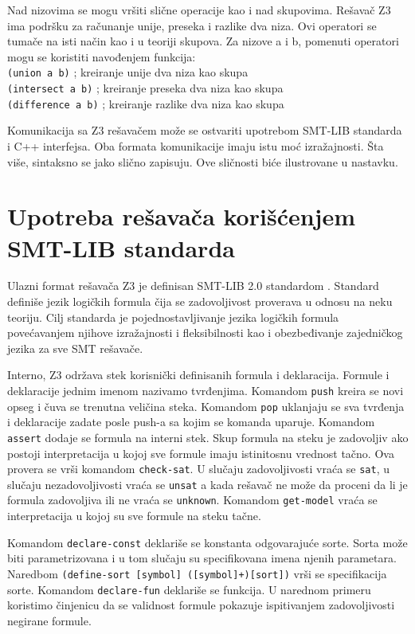 \documentclass[12pt,oneside]{memoir}
\begin{document}
Nad nizovima se mogu vršiti slične operacije kao i nad skupovima. Rešavač Z3 ima podršku za računanje unije, preseka i razlike dva niza. Ovi operatori se tumače na isti način kao i u teoriji skupova. Za nizove a i b, pomenuti operatori mogu se koristiti navođenjem funkcija:\\
\texttt{(union a b)} ; kreiranje unije dva niza kao skupa \\
\texttt{(intersect a b)} ; kreiranje preseka dva niza kao skupa \\
\texttt{(difference a b)} ; kreiranje razlike dva niza kao skupa

Komunikacija sa Z3 rešavačem može se ostvariti upotrebom SMT-LIB standarda i C++ interfejsa. Oba formata komunikacije imaju istu moć izražajnosti. Šta više, sintaksno se jako slično zapisuju. Ove sličnosti biće ilustrovane u nastavku.

\section{Upotreba rešavača korišćenjem SMT-LIB standarda} \label{sec:num3}
Ulazni format rešavača Z3 je definisan SMT-LIB 2.0 standardom \cite{SMTLIB}. Standard definiše jezik logičkih formula čija se zadovoljivost proverava u odnosu na neku teoriju. Cilj standarda je pojednostavljivanje jezika logičkih formula povećavanjem njihove izražajnosti i fleksibilnosti kao i obezbeđivanje zajedničkog jezika za sve SMT rešavače. 
\par
Interno, Z3 održava stek korisnički definisanih formula i deklaracija. Formule i deklaracije jednim imenom nazivamo tvrđenjima. Komandom \texttt{push} kreira se novi opseg i čuva se trenutna veličina steka. Komandom \texttt{pop} uklanjaju se sva tvrđenja i deklaracije zadate posle push-a sa kojim se komanda uparuje. Komandom \texttt{assert} dodaje se formula na interni stek. Skup formula na steku je zadovoljiv ako postoji interpretacija u kojoj sve formule imaju istinitosnu vrednost tačno. Ova provera se vrši komandom \texttt{check-sat}. U slučaju zadovoljivosti vraća se \texttt{sat}, u slučaju nezadovoljivosti vraća se \texttt{unsat} a kada rešavač ne može da proceni da li je formula zadovoljiva ili ne vraća se \texttt{unknown}. Komandom \texttt{get-model} vraća se interpretacija u kojoj su sve formule na steku tačne. 
\par

Komandom \texttt{declare-const} deklariše se konstanta odgovarajuće sorte. Sorta može biti parametrizovana i u tom slučaju su specifikovana imena njenih parametara. Naredbom \texttt{(define-sort [symbol] ([symbol]+)[sort])} vrši se specifikacija sorte.
Komandom \texttt{declare-fun} deklariše se funkcija. 
U narednom primeru koristimo činjenicu da se validnost formule pokazuje ispitivanjem zadovoljivosti negirane formule. 
\end{document}
